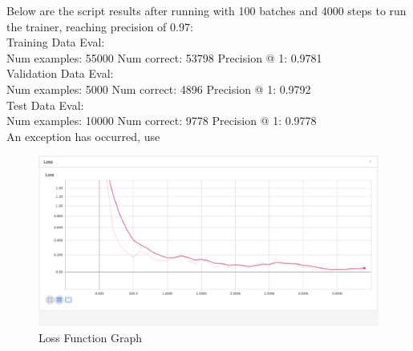 \documentclass[12pt]{article}
\begin{document}
Below are the script results after running with 100 batches and 4000 steps to run the trainer, reaching precision of $0.97$:\\

Training Data Eval:\\
Num examples: 55000  Num correct: 53798  Precision @ 1: 0.9781\\
Validation Data Eval:\\
Num examples: 5000  Num correct: 4896  Precision @ 1: 0.9792\\
Test Data Eval:\\
Num examples: 10000  Num correct: 9778  Precision @ 1: 0.9778\\
An exception has occurred, use \\

\begin{figure}[H]
\caption{Loss Function Graph}
\centering
  \includegraphics[width=\linewidth]{Loss.png}
\end{figure}
\end{document}

